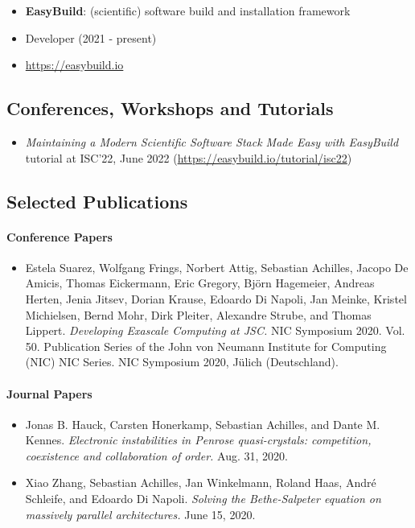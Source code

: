 \begin{itemize}
\item[] \textbf{EasyBuild}: (scientific) software build and installation framework
\item[] Developer (2021 - present)
\item[] \url{https://easybuild.io}
\end{itemize}

\subsection*{Conferences, Workshops and Tutorials}
\begin{itemize}
\item[] \emph{Maintaining a Modern Scientific Software Stack Made Easy with EasyBuild} tutorial at ISC'22, June 2022 (\url{https://easybuild.io/tutorial/isc22})
\end{itemize}

\subsection*{Selected Publications}

\paragraph{Conference Papers}

\begin{itemize}
\item[] Estela Suarez, Wolfgang Frings, Norbert Attig, Sebastian Achilles, Jacopo De Amicis, Thomas
Eickermann, Eric Gregory, Björn Hagemeier, Andreas Herten, Jenia Jitsev, Dorian Krause,
Edoardo Di Napoli, Jan Meinke, Kristel Michielsen, Bernd Mohr, Dirk Pleiter, Alexandre
Strube, and Thomas Lippert. \emph{Developing Exascale Computing at JSC.} NIC Symposium
2020. Vol. 50. Publication Series of the John von Neumann Institute for Computing (NIC)
NIC Series. NIC Symposium 2020, Jülich (Deutschland).
\end{itemize}

\paragraph{Journal Papers}

\begin{itemize}
  \item [] Jonas B. Hauck, Carsten Honerkamp, Sebastian Achilles, and Dante M. Kennes. \emph{Electronic
instabilities in Penrose quasi-crystals: competition, coexistence and collaboration of order.} Aug. 31, 2020.
  \item[] Xiao Zhang, Sebastian Achilles, Jan Winkelmann, Roland Haas, André Schleife, and Edoardo Di
Napoli. \emph{Solving the Bethe-Salpeter equation on massively parallel architectures.} June 15, 2020.
\end{itemize}


\newpage
